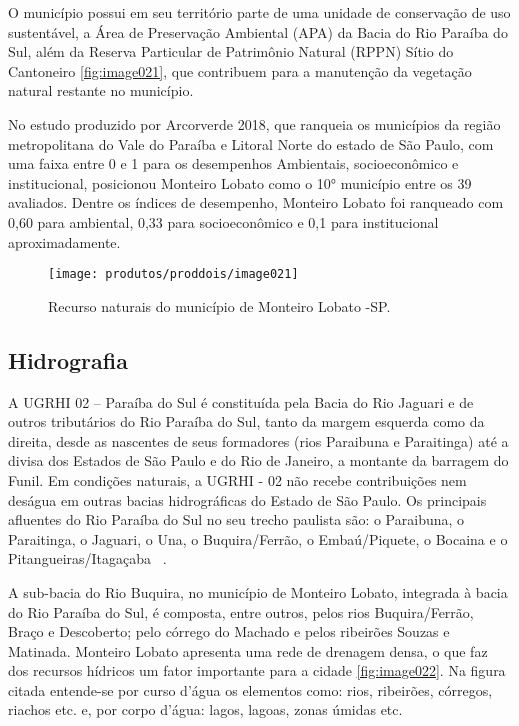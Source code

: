 O município possui em seu território parte de uma unidade de conservação de uso sustentável, a Área de Preservação Ambiental (APA) da Bacia do Rio Paraíba do Sul, além da Reserva Particular de Patrimônio Natural (RPPN) Sítio do Cantoneiro \autoref{fig:image021}, que contribuem para a manutenção da vegetação natural restante no município. 

No estudo produzido por Arcorverde 2018, que ranqueia os municípios da região metropolitana do Vale do Paraíba e Litoral Norte do estado de São Paulo, com uma faixa entre 0 e 1 para os desempenhos Ambientais, socioeconômico e institucional, posicionou Monteiro Lobato como o 10° município entre os 39 avaliados.   Dentre os índices de desempenho, Monteiro Lobato foi ranqueado com 0,60 para ambiental, 0,33 para socioeconômico e 0,1 para institucional ~\cite{arcoverdeproposiccao} aproximadamente. 
\newpage
\begin{figure}[h!]
	\centering
	\texttt{[image: produtos/proddois/image021]}
	\caption{Recurso naturais do município de Monteiro Lobato -SP.}
	\label{fig:image021}
\end{figure}
\clearpage
\subsection{Hidrografia}

A UGRHI  02 – Paraíba do Sul é constituída pela Bacia do Rio Jaguari e de outros tributários do Rio Paraíba do Sul, tanto da margem esquerda como da direita, desde as nascentes de seus formadores (rios Paraibuna e Paraitinga) até a divisa dos Estados de São Paulo e do Rio de Janeiro, a montante da barragem do Funil. Em condições naturais, a UGRHI - 02 não recebe contribuições nem deságua em outras bacias hidrográficas do Estado de São Paulo. Os principais afluentes do Rio Paraíba do Sul no seu trecho paulista são: o Paraibuna, o Paraitinga, o Jaguari, o Una, o Buquira/Ferrão, o Embaú/Piquete, o Bocaina e o Pitangueiras/Itagaçaba ~\cite{MonteiroLobato2014}.

A sub-bacia do Rio Buquira, no município de Monteiro Lobato, integrada à bacia do Rio Paraíba do Sul, é composta, entre outros, pelos rios Buquira/Ferrão, Braço e Descoberto; pelo córrego do Machado e pelos ribeirões Souzas e Matinada. Monteiro Lobato apresenta uma rede de drenagem densa, o que faz dos recursos hídricos um fator importante para a cidade \autoref{fig:image022}. Na figura citada entende-se por curso d’água os elementos como: rios, ribeirões, córregos, riachos etc. e, por corpo d’água:  lagos, lagoas, zonas úmidas etc. 

